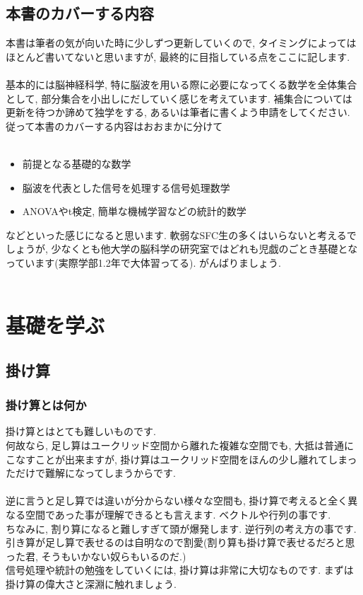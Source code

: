 \documentclass[11pt,a4paper]{jreport}
\begin{document}
\section{本書のカバーする内容}
本書は筆者の気が向いた時に少しずつ更新していくので, タイミングによってはほとんど書いてないと思いますが, 最終的に目指している点をここに記します.\\
\\
基本的には脳神経科学, 特に脳波を用いる際に必要になってくる数学を全体集合として, 部分集合を小出しにだしていく感じを考えています. 補集合については更新を待つか諦めて独学をする, あるいは筆者に書くよう申請をしてください. 従って本書のカバーする内容はおおまかに分けて\\
\\
\begin{itemize}
 \item 前提となる基礎的な数学
 \item 脳波を代表とした信号を処理する信号処理数学
 \item ANOVAやt検定, 簡単な機械学習などの統計的数学
\end{itemize}

などといった感じになると思います. 軟弱なSFC生の多くはいらないと考えるでしょうが, 少なくとも他大学の脳科学の研究室ではどれも児戯のごとき基礎となっています(実際学部1.2年で大体習ってる). がんばりましょう.
\\
\\
\chapter{基礎を学ぶ}
\section{掛け算}
\subsection{掛け算とは何か}
掛け算とはとても難しいものです.\\
何故なら, 足し算はユークリッド空間から離れた複雑な空間でも, 大抵は普通にこなすことが出来ますが, 掛け算はユークリッド空間をほんの少し離れてしまっただけで難解になってしまうからです. \\
\\
逆に言うと足し算では違いが分からない様々な空間も, 掛け算で考えると全く異なる空間であった事が理解できるとも言えます. ベクトルや行列の事です.\\
ちなみに, 割り算になると難しすぎて頭が爆発します. 逆行列の考え方の事です. \\
引き算が足し算で表せるのは自明なので割愛(割り算も掛け算で表せるだろと思った君, そうもいかない奴らもいるのだ.)\\
信号処理や統計の勉強をしていくには, 掛け算は非常に大切なものです. まずは掛け算の偉大さと深淵に触れましょう.\\
\\
\end{document}

